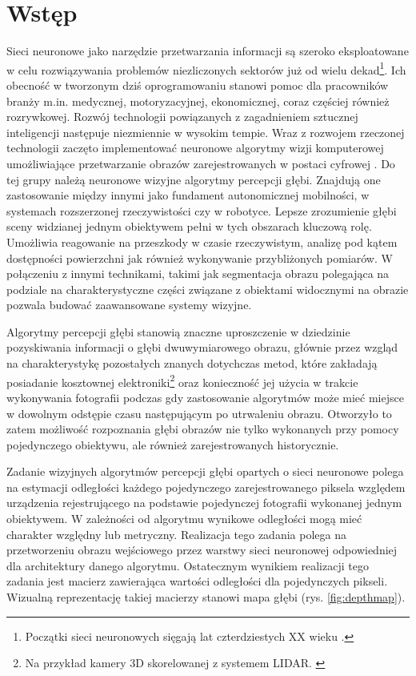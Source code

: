 \chapter{Wstęp}\label{chap:wstęp}

Sieci neuronowe jako narzędzie przetwarzania informacji są szeroko eksploatowane w celu rozwiązywania problemów niezliczonych sektorów już od wielu dekad\footnote{Początki sieci neuronowych sięgają lat czterdziestych XX wieku \cite{mccullochpitts1943}.}. Ich obecność w tworzonym dziś oprogramowaniu stanowi pomoc dla pracowników branży m.in. medycznej, motoryzacyjnej, ekonomicznej, coraz częściej również rozrywkowej. Rozwój technologii powiązanych z zagadnieniem sztucznej inteligencji następuje niezmiennie w wysokim tempie. Wraz z rozwojem rzeczonej technologii zaczęto implementować neuronowe algorytmy wizji komputerowej umożliwiające przetwarzanie obrazów zarejestrowanych w postaci cyfrowej \cite{tadeusiewiczflasinski1991}. Do tej grupy należą neuronowe wizyjne algorytmy percepcji głębi. Znajdują one zastosowanie między innymi jako fundament autonomicznej mobilności, w systemach rozszerzonej rzeczywistości czy w robotyce. Lepsze zrozumienie głębi sceny widzianej jednym obiektywem pełni w tych obszarach kluczową rolę. Umożliwia reagowanie na przeszkody w czasie rzeczywistym, analizę pod kątem dostępności powierzchni jak również wykonywanie przybliżonych pomiarów. W połączeniu z innymi technikami, takimi jak segmentacja obrazu \cite{minaee2021} polegająca na podziale na charakterystyczne części związane z obiektami widocznymi na obrazie pozwala budować zaawansowane systemy wizyjne.

Algorytmy percepcji głębi stanowią znaczne uproszczenie w dziedzinie pozyskiwania informacji o głębi dwuwymiarowego obrazu, głównie przez wzgląd na charakterystykę pozostałych znanych dotychczas metod, które zakładają posiadanie kosztownej elektroniki\footnote{Na przykład kamery 3D skorelowanej z systemem LIDAR. \cite{dubik1989}} oraz konieczność jej użycia w trakcie wykonywania fotografii podczas gdy zastosowanie algorytmów może mieć miejsce w dowolnym odstępie czasu następującym po utrwaleniu obrazu. Otworzyło to zatem możliwość rozpoznania głębi obrazów nie tylko wykonanych przy pomocy pojedynczego obiektywu, ale również zarejestrowanych historycznie.

Zadanie wizyjnych algorytmów percepcji głębi opartych o sieci neuronowe polega na estymacji odległości każdego pojedynczego zarejestrowanego piksela względem urządzenia rejestrującego na podstawie pojedynczej fotografii wykonanej jednym obiektywem. W zależności od algorytmu wynikowe odległości mogą mieć charakter względny lub metryczny. Realizacja tego zadania polega na przetworzeniu obrazu wejściowego przez warstwy sieci neuronowej odpowiedniej dla architektury danego algorytmu. Ostatecznym wynikiem realizacji tego zadania jest macierz zawierająca wartości odległości dla pojedynczych pikseli. Wizualną reprezentację takiej macierzy stanowi mapa głębi (rys. \ref{fig:depthmap}).

